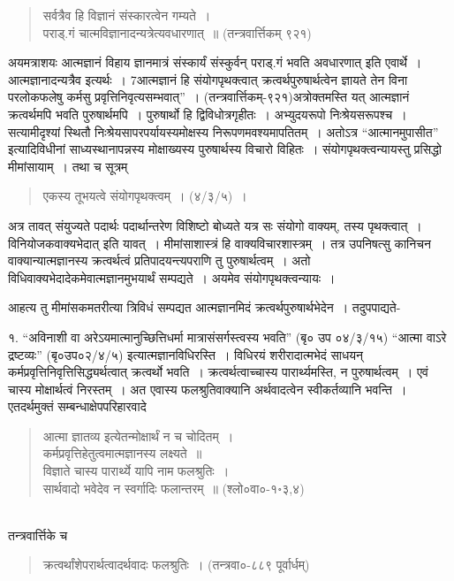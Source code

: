 {\begin{verse}
सर्वत्रैव हि विज्ञानं संस्कारत्वेन गम्यते~। \\
पराड्.गं चात्मविज्ञानादन्यत्रेत्यवधारणात्~॥ (तन्त्रवार्त्तिकम् ९२१)
\end{verse}

अयमत्राशयः  आत्मज्ञानं विहाय ज्ञानमात्रं संस्कार्यं संस्कुर्वन् पराड्.गं भवति अव\-धारणात् इति एवार्थे~। आत्मज्ञानादन्यत्रैव इत्यर्थः~। 7आत्मज्ञानं हि संयोगपृथक्त्वात् क्रत्वर्थ\-पुरुषार्थत्वेन ज्ञायते तेन विना परलोकफलेषु कर्मसु प्रवृत्तिनिवृत्यसम्भवात्”~। (तन्त्रवार्त्तिकम्-९२१)\break अत्रोक्तमस्ति यत् आत्मज्ञानं क्रत्वर्थमपि भवति पुरुषार्थमपि~। पुरुषार्थो हि द्विविधोत्र\break गृहीतः~। अभ्युदयरूपो निःश्रेयसरूपश्च~। सत्यामीदृश्यां स्थितौ निःश्रेयसापरपर्यायस्य\break मोक्षस्य निरूपणमवश्यमापतितम्~। अतोऽत्र “आत्मानमुपासीत” इत्यादिविधीनां साध्यस्था\-नापन्नस्य मोक्षाख्यस्य पुरुषार्थस्य विचारो विहितः~। संयोगपृथक्त्वन्यायस्तु प्रसिद्धो मीमांसा\-याम्~। तथा च सूत्रम्  

\begin{verse}
एकस्य तूभयत्वे संयोगपृथक्त्वम्~। (४/३/५)~। 
\end{verse}
अत्र तावत् संयुज्यते पदार्थः पदार्थान्तरेण विशिष्टो बोध्यते यत्र सः संयोगो वाक्यम्, तस्य पृथक्त्वात्~। विनियोजकवाक्यभेदात् इति यावत्~। मीमांसाशास्त्रं हि वाक्यविचारशास्त्रम्~। तत्र उपनिषत्सु कानिचन वाक्यान्यात्मज्ञानस्य क्रत्वर्थत्वं प्रतिपादयन्त्यपराणि तु पुरुषार्थत्वम्~। अतो विधिवाक्यभेदादेकमेवात्मज्ञानमुभयार्थं सम्पद्यते~। अयमेव संयोगपृथक्त्वन्यायः~। 

आहत्य तु मीमांसकमतरीत्या त्रिविधं सम्पद्यत आत्मज्ञानमिदं क्रत्वर्थपुरुषार्थभेदेन~। तदुपपाद्यते-

१. “अविनाशी वा अरेऽयमात्मानुच्छित्तिधर्मा मात्रासंसर्गस्त्वस्य भवति” (बृ० उप ०४/३/१५) “आत्मा वाऽरे द्रष्टव्यः” (बृ०उप०२/४/५) इत्यात्मज्ञानविधिरस्ति~। विधिरयं शरीरादात्मभेदं साधयन् कर्मप्रवृत्तिनिवृत्तिसिद्ध्यर्थत्वात् क्रत्वर्थो भवति~। क्रत्वर्थत्वाच्चास्य पारार्थ्यमस्ति, न पुरुषार्थत्वम्~। एवं चास्य मोक्षार्थत्वं निरस्तम्~। अत एवास्य फलश्रुतिवाक्यानि अर्थवादत्वेन स्वीकर्तव्यानि भवन्ति~। एतदर्थमुक्तं सम्बन्धाक्षेपपरिहारवादे
\newpage
\begin{verse}
आत्मा ज्ञातव्य इत्येतन्मोक्षार्थं न च चोदितम्~। \\
कर्मप्रवृत्तिहेतुत्वमात्मज्ञानस्य लक्ष्यते~॥ \\
विज्ञाते चास्य पारार्थ्ये यापि नाम फलश्रुतिः~। \\
सार्थवादो भवेदेव न स्वर्गादिः फलान्तरम्~॥ (श्लो०वा०-१॰३,४)\\
\end{verse}
~\\[-1cm]
तन्त्रवार्त्तिके च
~\\[-1cm]
\begin{verse}
क्रत्वर्थांशेपरार्थत्वादर्थवादः फलश्रुतिः~। (तन्त्रवा०-८८९ पूर्वार्धम्)
\end{verse}

}
